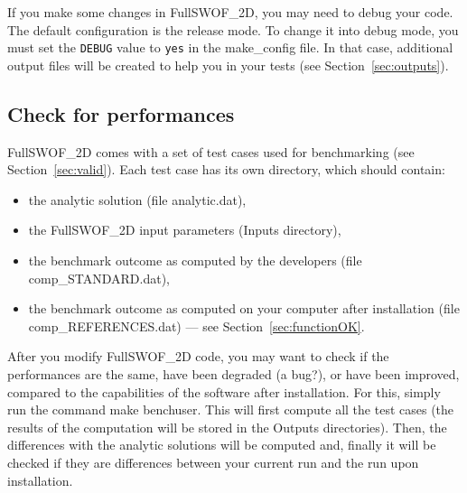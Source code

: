 \documentclass[a4paper, 11pt]{article}
\newcommand{\FullSWOF}{FullSWOF\_2D}
\begin{document}
If you make some changes in \FullSWOF, you may need to debug your code.
The default configuration is the release mode.
To change it into debug mode, you must set the \texttt{DEBUG} value to \texttt{yes} in the \textsf{make\_config} file.
In that case, additional output files will be created to help you in your tests (see Section~\ref{sec:outputs}).

\subsection{Check for performances}\label{sec:perfo}

\sloppy
\FullSWOF{} comes with a set of test cases used for benchmarking (see Section~\ref{sec:valid}).
Each test case has its own directory, which should contain:
\begin{itemize}
	\item the analytic solution (file \textsf{analytic.dat}),
	\item the \FullSWOF{} input parameters (\textsf{Inputs} directory),
	\item the benchmark outcome as computed by the developers (file \textsf{comp\_STANDARD.dat}),
	\item the benchmark outcome as computed on your computer after installation (file \textsf{comp\_REFERENCES.dat}) --- see Section~\ref{sec:functionOK}.
\end{itemize}

After you modify \FullSWOF{} code, you may want to check if the performances are the same, have been degraded (a bug?), or have been improved, compared to the capabilities of the software after installation.
For this, simply run the command \textsf{make benchuser}.
This will first compute all the test cases (the results of the computation will be stored in the \textsf{Outputs} directories).
Then, the differences with the analytic solutions will be computed and, finally it will be checked if they are differences between your current run and the run upon installation.
\end{document}
